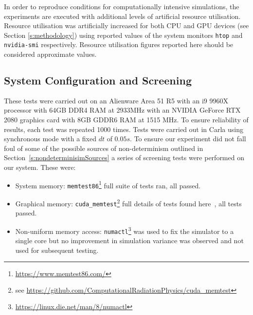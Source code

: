 \documentclass[letterpaper, 10 pt, journal, twoside]{IEEEtran}
\begin{document}
In order to reproduce conditions for computationally intensive simulations, the experiments are executed with additional levels of artificial resource utilisation. Resource utilisation was artificially increased for both CPU and GPU devices (see Section \ref{s:methodology}) using reported values of the system monitors \texttt{htop} and \texttt{nvidia-smi} respectively. Resource utilisation figures reported here should be considered approximate values.

\subsection{System Configuration and Screening}
These tests were carried out on an Alienware Area 51 R5 with an i9 9960X processor with 64GB DDR4 RAM at 2933MHz with an NVIDIA GeForce RTX 2080 graphics card with 8GB GDDR6 RAM at 1515 MHz. To ensure reliability of results, each test was repeated 1000 times. Tests were carried out in Carla using synchronous mode with a fixed $dt$ of $0.05s$. To ensure our experiment did not fall foul of some of the possible sources of non-determinism outlined in Section~\ref{s:nondeterminisimSources} a series of screening tests were performed on our system. These were:

\begin{itemize}[leftmargin=*]
    \item System memory: \texttt{memtest86}\footnote{\url{https://www.memtest86.com/}} full suite of tests ran, all passed.
    \item Graphical memory: \texttt{cuda\_memtest}\footnote{see \url{https://github.com/ComputationalRadiationPhysics/cuda_memtest}} full details of tests found here~\cite{shi2009testing}, all tests passed.
    \item Non-uniform memory access: \texttt{numactl}\footnote{\url{https://linux.die.net/man/8/numactl}} was used to fix the simulator to a single core but no improvement in simulation variance was observed and not used for subsequent testing.
\end{itemize}

\end{document}
